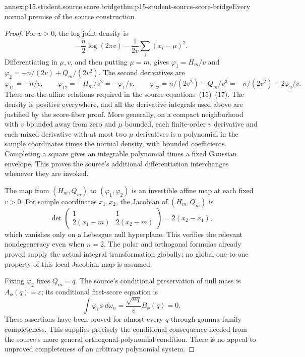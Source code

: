 \begin{annexitem}{annex:p15.student.source.score.bridge}{thm:p15-student-source-score-bridge}{Every normal premise of the source construction}
\begin{proof}
For \(v>0\), the log joint density is
\[
   -\frac n2\log(2\pi v)
                      -\frac1{2v}\sum_i(x_i-\mu)^2.
\]
Differentiating in \(\mu,v\), and then
putting \(\mu=m\), gives
\(\varphi_1=H_m/v\) and
\(\varphi_2=-n/(2v)+Q_m/(2v^2)\).
The second derivatives are
\[
 \varphi_{11}=-n/v,\qquad
 \varphi_{12}=-H_m/v^2=-\varphi_1/v,
 \qquad
 \varphi_{22}=n/(2v^2)-Q_m/v^3
                =-n/(2v^2)-2\varphi_2/v.
\]
These are the affine relations required in
the source equations~(15)--(17).
The density is positive everywhere, and
all the derivative integrals used above
are justified by the score-fiber proof.
More generally, on a compact neighborhood
with \(v\) bounded away from zero and
\(\mu\) bounded, each finite-order \(v\)
derivative and each mixed derivative with
at most two \(\mu\) derivatives is a
polynomial in the sample coordinates
times the normal density, with bounded
coefficients. Completing a square gives
an integrable polynomial times a fixed
Gaussian envelope. This proves the
source's additional differentiation
interchanges whenever they are invoked.

The map from \((H_m,Q_m)\) to
\((\varphi_1,\varphi_2)\) is an invertible
affine map at each fixed \(v>0\).
For sample coordinates \(x_1,x_2\), the
Jacobian of \((H_m,Q_m)\) is
\[
  \det\begin{pmatrix}
    1&1\\2(x_1-m)&2(x_2-m)
  \end{pmatrix}=2(x_2-x_1),
\]
which vanishes only on a Lebesgue null
hyperplane. This verifies the relevant
nondegeneracy even when \(n=2\).
The polar and orthogonal formulas already
proved supply the actual integral
transformation globally; no global
one-to-one property of this local
Jacobian map is assumed.

Fixing \(\varphi_2\) fixes \(Q_m=q\).
The source's conditional preservation
of null mass is \(A_\phi(q)=\varepsilon\);
its conditional first-score equation is
\[
       \int \varphi_1\phi\,d\omega_n
              =\frac{\sqrt{nq}}v B_\phi(q)=0.
\]
These assertions have been proved for
almost every \(q\) through gamma-family
completeness. This supplies precisely
the conditional consequence needed
from the source's more general
orthogonal-polynomial condition.
There is no appeal to unproved
completeness of an arbitrary polynomial
system.


\end{proof}
\end{annexitem}
